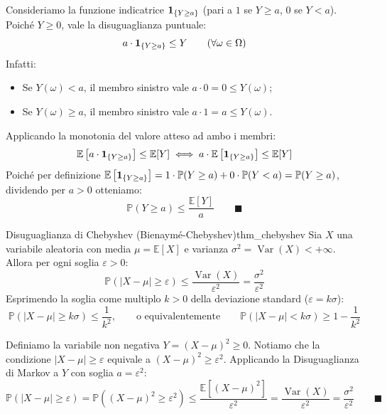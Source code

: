 \begin{dimostrazione}
Consideriamo la funzione indicatrice $\mathbf{1}_{\{Y \ge a\}}$ (pari a $1$ se $Y \ge a$, $0$ se $Y < a$). Poiché $Y \ge 0$, vale la disuguaglianza puntuale:
\begin{equation}
    a \cdot \mathbf{1}_{\{Y \ge a\}} \le Y \qquad (\forall \omega \in \Omega)
\end{equation}
Infatti:
\begin{itemize}
    \item Se $Y(\omega) < a$, il membro sinistro vale $a \cdot 0 = 0 \le Y(\omega)$;
    \item Se $Y(\omega) \ge a$, il membro sinistro vale $a \cdot 1 = a \le Y(\omega)$.
\end{itemize}
Applicando la monotonia del valore atteso ad ambo i membri:
\begin{equation}
    \mathbb{E}\left[a \cdot \mathbf{1}_{\{Y \ge a\}}\right] \le \mathbb{E}[Y] \iff a \cdot \mathbb{E}\left[\mathbf{1}_{\{Y \ge a\}}\right] \le \mathbb{E}[Y]
\end{equation}
Poiché per definizione $\mathbb{E}\left[\mathbf{1}_{\{Y \ge a\}}\right] = 1 \cdot \mathbb{P}(Y \ge a) + 0 \cdot \mathbb{P}(Y < a) = \mathbb{P}(Y \ge a)$, dividendo per $a > 0$ otteniamo:
\begin{equation}
    \mathbb{P}(Y \ge a) \le \frac{\mathbb{E}[Y]}{a} \qquad \blacksquare
\end{equation}
\end{dimostrazione}

\begin{teorema}{Disuguaglianza di Chebyshev (Bienaymé-Chebyshev)}{thm_chebyshev}
Sia $X$ una variabile aleatoria con media $\mu = \mathbb{E}[X]$ e varianza $\sigma^2 = \operatorname{Var}(X) < +\infty$. Allora per ogni soglia $\varepsilon > 0$:
\begin{equation}
    \mathbb{P}(|X - \mu| \ge \varepsilon) \le \frac{\operatorname{Var}(X)}{\varepsilon^2} = \frac{\sigma^2}{\varepsilon^2}
\end{equation}
Esprimendo la soglia come multiplo $k > 0$ della deviazione standard ($\varepsilon = k\sigma$):
\begin{equation}
    \mathbb{P}(|X - \mu| \ge k\sigma) \le \frac{1}{k^2}, \qquad \text{o equivalentemente} \qquad \mathbb{P}(|X - \mu| < k\sigma) \ge 1 - \frac{1}{k^2}
\end{equation}
\end{teorema}

\begin{dimostrazione}
Definiamo la variabile non negativa $Y = (X - \mu)^2 \ge 0$. Notiamo che la condizione $|X - \mu| \ge \varepsilon$ equivale a $(X - \mu)^2 \ge \varepsilon^2$.
Applicando la Disuguaglianza di Markov a $Y$ con soglia $a = \varepsilon^2$:
\begin{equation}
    \mathbb{P}(|X - \mu| \ge \varepsilon) = \mathbb{P}\left((X - \mu)^2 \ge \varepsilon^2\right) \le \frac{\mathbb{E}\left[(X - \mu)^2\right]}{\varepsilon^2} = \frac{\operatorname{Var}(X)}{\varepsilon^2} = \frac{\sigma^2}{\varepsilon^2} \qquad \blacksquare
\end{equation}
\end{dimostrazione}

